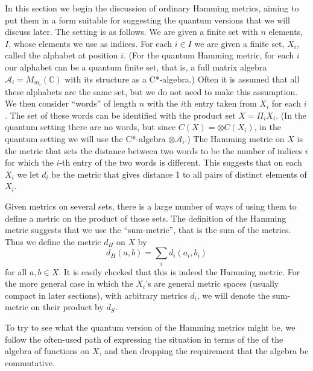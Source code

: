 \documentclass{amsart}[14pt]
\theoremstyle{definition}
\theoremstyle{remark}
\newcommand{\cA}{{\mathcal A}}
\newcommand{\bC}{{\mathbb C}}
\newcommand{\<}{\langle}
\renewcommand{\>}{\rangle}
\numberwithin{equation}{section}
\begin{document}
{In this section we begin the discussion of ordinary 
Hamming metrics, aiming to put them in
a form suitable for suggesting the quantum versions 
that we will discuss later.
The setting is as follows.
We are given a finite set with $n$ elements, $I$, 
whose elements we use as indices.
For each $i \in I$ we are given a finite set, $X_i$,
called the alphabet at position $i$. 
(For the quantum Hamming metric, for each $i$ 
our alphabet can be a quantum
finite set, that is, a full matrix algebra 
$\cA_i = M_{m_i}(\bC)$ with its structure as a C*-algebra.) 
Often it is assumed that all
these alphabets are the same set, but we do not need
to make this assumption. We then consider ``words'' 
of length $n$ with the $i$th entry taken from $X_i$
for each $i$. The set of these words can be
identified with the product set $X = \Pi_i X_i$.
 (In the quantum setting there are no words, but
 since $C(X) = \otimes C(X_i)$,
in the quantum setting we will use
the C*-algebra $\otimes \cA_i$.) The 
Hamming metric on $X$ is the metric that sets
the distance between two words to be the
number of indices $i$ for which the $i$-th entry of
the two words is different.
This suggests that on each $X_i$ we let $d_i$
be the metric that gives distance 1 to all pairs
of distinct elements of $X_i$. 

Given metrics on several sets, there is a large
number of ways of using them to define a metric 
on the product of those sets. The definition of
the Hamming metric suggests that we use
the ``sum-metric'', that is
the sum of the metrics. Thus we define
the metric $d_H$ on $X$ by
\[
d_H(a, b) = \sum_i d_i(a_i,b_i)
\]
for all $a, b  \in X$. It is easily checked that
this is indeed the Hamming metric. For the more general
case in which the $X_i$'s are general metric
spaces (usually compact in later sections), with arbitrary metrics
$d_i$, we will denote the sum-metric on their
product by $d_S$.

To try to see what the quantum version of the
Hamming metrics might be, we follow the often-used
path of expressing the situation in
terms of the of the algebra of functions on
$X$, and then dropping the requirement that
the algebra be commutative.

}
\end{document}
